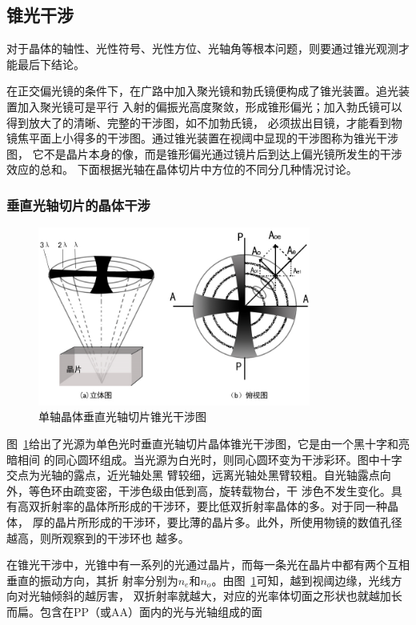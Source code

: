 \documentclass[11pt,a4paper]{article}
\begin{document}
\begin{spacing}{1.3}
\begin{CJK*}{UTF8}{gbsn}
\subsection{锥光干涉}
对于晶体的轴性、光性符号、光性方位、光轴角等根本问题，则要通过锥光观测才能最后下结论。\par
在正交偏光镜的条件下，在广路中加入聚光镜和勃氏镜便构成了锥光装置。追光装置加入聚光镜可是平行
入射的偏振光高度聚敛，形成锥形偏光；加入勃氏镜可以得到放大了的清晰、完整的干涉图，如不加勃氏镜，
必须拔出目镜，才能看到物镜焦平面上小得多的干涉图。通过锥光装置在视阈中显现的干涉图称为锥光干涉图，
它不是晶片本身的像，而是锥形偏光通过镜片后到达上偏光镜所发生的干涉效应的总和。
下面根据光轴在晶体切片中方位的不同分几种情况讨论。
\subsubsection{垂直光轴切片的晶体干涉}
\begin{figure}
\centering
\includegraphics[width=0.8\textwidth]{fig4-1-8}
\caption{单轴晶体垂直光轴切片锥光干涉图}
\label{fig:4-1-8}
\end{figure}
图~\ref{fig:4-1-8}给出了光源为单色光时垂直光轴切片晶体锥光干涉图，它是由一个黑十字和亮暗相间
的同心圆环组成。当光源为白光时，则同心圆环变为干涉彩环。图中十字交点为光轴的露点，近光轴处黑
臂较细，远离光轴处黑臂较粗。自光轴露点向外，等色环由疏变密，干涉色级由低到高，旋转载物台，干
涉色不发生变化。具有高双折射率的晶体所形成的干涉环，要比低双折射率晶体的多。对于同一种晶体，
厚的晶片所形成的干涉环，要比薄的晶片多。此外，所使用物镜的数值孔径越高，则所观察到的干涉环也
越多。\par
在锥光干涉中，光锥中有一系列的光通过晶片，而每一条光在晶片中都有两个互相垂直的振动方向，其折
射率分别为$n_e$和$n_o$。由图~\ref{fig:4-1-8}可知，越到视阈边缘，光线方向对光轴倾斜的越厉害，
双折射率就越大，对应的光率体切面之形状也就越加长而扁。包含在PP（或AA）面内的光与光轴组成的面

\end{CJK*}
\end{spacing}
\end{document}
